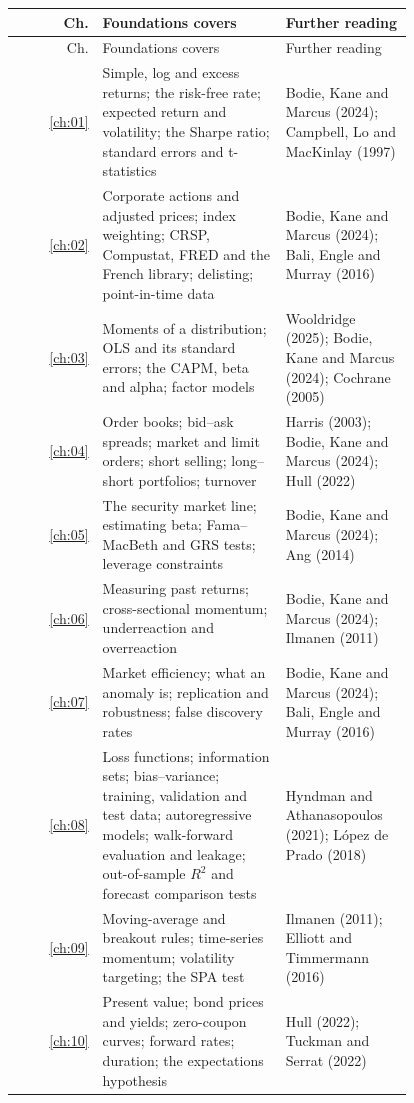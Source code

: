 \begingroup
\small
\setlength{\LTpre}{6pt}\setlength{\LTpost}{6pt}
\begin{longtable}{@{}r>{\raggedright\arraybackslash}p{0.468\linewidth}>{\raggedright\arraybackslash}p{0.324\linewidth}@{}}
\toprule
Ch. & Foundations covers & Further reading \\
\midrule
\endfirsthead
\toprule
Ch. & Foundations covers & Further reading \\
\midrule
\endhead
\bottomrule
\endlastfoot
\ref{ch:01} & Simple, log and excess returns; the risk-free rate; expected return and volatility; the Sharpe ratio; standard errors and t-statistics & Bodie, Kane and Marcus (2024); Campbell, Lo and MacKinlay (1997) \\
\ref{ch:02} & Corporate actions and adjusted prices; index weighting; CRSP, Compustat, FRED and the French library; delisting; point-in-time data & Bodie, Kane and Marcus (2024); Bali, Engle and Murray (2016) \\
\ref{ch:03} & Moments of a distribution; OLS and its standard errors; the CAPM, beta and alpha; factor models & Wooldridge (2025); Bodie, Kane and Marcus (2024); Cochrane (2005) \\
\ref{ch:04} & Order books; bid--ask spreads; market and limit orders; short selling; long--short portfolios; turnover & Harris (2003); Bodie, Kane and Marcus (2024); Hull (2022) \\
\ref{ch:05} & The security market line; estimating beta; Fama--MacBeth and GRS tests; leverage constraints & Bodie, Kane and Marcus (2024); Ang (2014) \\
\ref{ch:06} & Measuring past returns; cross-sectional momentum; underreaction and overreaction & Bodie, Kane and Marcus (2024); Ilmanen (2011) \\
\ref{ch:07} & Market efficiency; what an anomaly is; replication and robustness; false discovery rates & Bodie, Kane and Marcus (2024); Bali, Engle and Murray (2016) \\
\ref{ch:08} & Loss functions; information sets; bias--variance; training, validation and test data; autoregressive models; walk-forward evaluation and leakage; out-of-sample $R^2$ and forecast comparison tests & Hyndman and Athanasopoulos (2021); L\'opez de Prado (2018) \\
\ref{ch:09} & Moving-average and breakout rules; time-series momentum; volatility targeting; the SPA test & Ilmanen (2011); Elliott and Timmermann (2016) \\
\ref{ch:10} & Present value; bond prices and yields; zero-coupon curves; forward rates; duration; the expectations hypothesis & Hull (2022); Tuckman and Serrat (2022) \\

\end{longtable}
